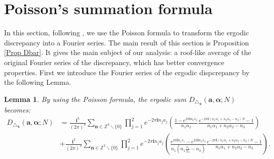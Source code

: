\documentclass[11pt]{article}
\newtheorem{lem}[thm]{Lemma}
\newcommand{\fc}{\frac}
\newcommand{\Z}{\mathbb{Z}}
\renewcommand{\a}{\alpha}
\renewcommand{\i}{\mathbf{i}}
\renewcommand{\(}{\left(}
\renewcommand{\)}{\right)}
\renewcommand{\bf}{\mathbf}
\newcommand{\<}{\langle}
\renewcommand{\>}{\rangle}
\begin{document}
\section{Poisson's summation formula}

In this section, following \cite{Beck}, we use the Poisson formula to transform the ergodic discrepancy into a Fourier series.  The main result of this section is Proposition \ref{Prop Dbar}. It gives the main subject of our analysis: a roof-like average of the original Fourier series of the discrepancy, which has better convergence properties. First we introduce the Fourier series of the ergodic dispcrepancy by the following Lemma.
\begin{lem}{\label{Lemma of Fourier Series}}
By using the Poisson formula, the ergodic sum $D_{\triangle_{\bf{x}}} (\bm{a},\bm{\a}; N)$ becomes:
$$
\begin{aligned}
D_{\triangle_{\bf{x}}} (\bm{a},\bm{\a}; N)
&=\fc{\i^3}{(2\pi)^3} \sum_{\bf{n}\in \Z^3\backslash\{0\}} 
\prod_{j=1}^2 e^{-2\pi \i n_ja_j}\(\fc{1-e^{2\pi \i n_2x_2}}{n_1 n_2}\fc{e^{-2\pi \i (n_1\a_1+n_2\a_2-n_3)N}-1}{n_1\a_1+n_2\a_2-n_3}\)\\
&+\fc{\i^3}{(2\pi)^3} \sum_{\bf{n}\in \Z^3\backslash\{0\}} 
\prod_{j=1}^2 e^{-2\pi \i n_ja_j}\(\fc{e^{2\pi\i n_1x_1}-e^{2\pi\i n_2 x_2}}{n_1(n_1\fc{x_1}{x_2}-n_2)}\fc{e^{-2\pi \i (n_1\a_1+n_2\a_2-n_3)N}-1}{n_1\a_1+n_2\a_2-n_3}\).
\end{aligned}
$$
\end{lem}
\end{document}
